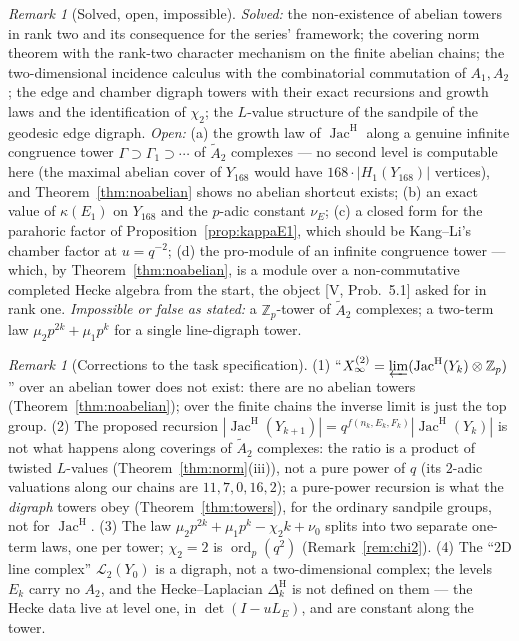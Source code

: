 \documentclass[11pt]{amsart}
\numberwithin{equation}{section}
\theoremstyle{definition}
\theoremstyle{remark}
\newtheorem{remark}[theorem]{Remark}
\newcommand{\Z}{\mathbb{Z}}
\newcommand{\Zp}{\Z_p}
\newcommand{\Jac}{\operatorname{Jac}}
\newcommand{\ord}{\operatorname{ord}}
\newcommand{\Atwo}{\widetilde A_2}
\newcommand{\DeltaH}{\Delta^{\mathrm{H}}}
\newcommand{\JacH}{\Jac^{\mathrm{H}}}
\newcommand{\LE}{L_{E}}
\begin{document}
\begin{remark}[Solved, open, impossible]\label{rem:scope}
\emph{Solved:} the non-existence of abelian towers in rank two and its consequence for the
series' framework; the covering norm theorem with the rank-two character mechanism on the
finite abelian chains; the two-dimensional incidence calculus with the combinatorial
commutation of $A_1,A_2$; the edge and chamber digraph towers with their exact recursions
and growth laws and the identification of $\chi_2$; the $L$-value structure of the sandpile
of the geodesic edge digraph. \emph{Open:} (a) the growth law of $\JacH$ along a genuine
infinite congruence tower $\Gamma\supset\Gamma_1\supset\cdots$ of $\Atwo$ complexes --- no
second level is computable here (the maximal abelian cover of $Y_{168}$ would have
$168\cdot|H_1(Y_{168})|$ vertices), and Theorem~\ref{thm:noabelian} shows no abelian
shortcut exists; (b) an exact value of $\kappa(E_1)$ on $Y_{168}$ and the $p$-adic constant
$\nu_E$; (c) a closed form for the parahoric factor of Proposition~\ref{prop:kappaE1}, which
should be Kang--Li's chamber factor at $u=q^{-2}$; (d) the pro-module of an infinite
congruence tower --- which, by Theorem~\ref{thm:noabelian}, is a module over a
non-commutative completed Hecke algebra from the start, the object [V, Prob.~5.1] asked for
in rank one. \emph{Impossible or false as stated:} a $\Z_p$-tower of $\Atwo$ complexes; a
two-term law $\mu_2p^{2k}+\mu_1p^{k}$ for a single line-digraph tower.
\end{remark}

\begin{remark}[Corrections to the task specification]\label{rem:corrections}
(1) ``$X_\infty^{(2)}=\varprojlim(\JacH(Y_k)\otimes\Zp)$'' over an abelian tower does not
exist: there are no abelian towers (Theorem~\ref{thm:noabelian}); over the finite chains the
inverse limit is just the top group. (2) The proposed recursion $|\JacH(Y_{k+1})|=
q^{f(n_k,E_k,F_k)}|\JacH(Y_k)|$ is not what happens along coverings of $\Atwo$ complexes: the
ratio is a product of twisted $L$-values (Theorem~\ref{thm:norm}(iii)), not a pure power of
$q$ (its $2$-adic valuations along our chains are $11,7,0,16,2$); a pure-power recursion is
what the \emph{digraph} towers obey (Theorem~\ref{thm:towers}), for the ordinary sandpile
groups, not for $\JacH$. (3) The law $\mu_2p^{2k}+\mu_1p^{k}-\chi_2k+\nu_0$ splits into two
separate one-term laws, one per tower; $\chi_2=2$ is $\ord_p(q^{2})$
(Remark~\ref{rem:chi2}). (4) The ``2D line complex'' $\mathcal L_2(Y_0)$ is a digraph, not a
two-dimensional complex; the levels $E_k$ carry no $A_2$, and the Hecke--Laplacian
$\DeltaH_k$ is not defined on them --- the Hecke data live at level one, in
$\det(I-u\LE)$, and are constant along the tower.
\end{remark}
\end{document}
